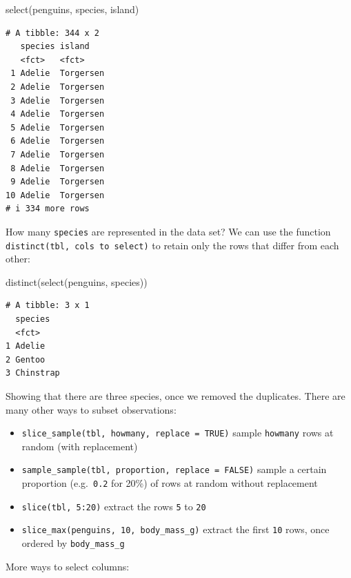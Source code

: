 \documentclass[
  letterpaper,
  DIV=11,
  numbers=noendperiod]{scrreprt}
\newenvironment{Shaded}{\begin{snugshade}}{\end{snugshade}}
\newcommand{\FunctionTok}[1]{\textcolor[rgb]{0.28,0.35,0.67}{#1}}
\newcommand{\NormalTok}[1]{\textcolor[rgb]{0.00,0.23,0.31}{#1}}
\providecommand{\tightlist}{%
  \setlength{\itemsep}{0pt}\setlength{\parskip}{0pt}}\usepackage{longtable,booktabs,array}
\begin{document}
\begin{Shaded}
\begin{Highlighting}[]
\FunctionTok{select}\NormalTok{(penguins, species, island)}
\end{Highlighting}
\end{Shaded}

\begin{verbatim}
# A tibble: 344 x 2
   species island   
   <fct>   <fct>    
 1 Adelie  Torgersen
 2 Adelie  Torgersen
 3 Adelie  Torgersen
 4 Adelie  Torgersen
 5 Adelie  Torgersen
 6 Adelie  Torgersen
 7 Adelie  Torgersen
 8 Adelie  Torgersen
 9 Adelie  Torgersen
10 Adelie  Torgersen
# i 334 more rows
\end{verbatim}

How many \texttt{species} are represented in the data set? We can use
the function \texttt{distinct(tbl,\ cols\ to\ select)} to retain only
the rows that differ from each other:

\begin{Shaded}
\begin{Highlighting}[]
\FunctionTok{distinct}\NormalTok{(}\FunctionTok{select}\NormalTok{(penguins, species))}
\end{Highlighting}
\end{Shaded}

\begin{verbatim}
# A tibble: 3 x 1
  species  
  <fct>    
1 Adelie   
2 Gentoo   
3 Chinstrap
\end{verbatim}

Showing that there are three species, once we removed the duplicates.
There are many other ways to subset observations:

\begin{itemize}
\tightlist
\item
  \texttt{slice\_sample(tbl,\ howmany,\ replace\ =\ TRUE)} sample
  \texttt{howmany} rows at random (with replacement)
\item
  \texttt{sample\_sample(tbl,\ proportion,\ replace\ =\ FALSE)} sample a
  certain proportion (e.g.~\texttt{0.2} for 20\%) of rows at random
  without replacement
\item
  \texttt{slice(tbl,\ 5:20)} extract the rows \texttt{5} to \texttt{20}
\item
  \texttt{slice\_max(penguins,\ 10,\ body\_mass\_g)} extract the first
  \texttt{10} rows, once ordered by \texttt{body\_mass\_g}
\end{itemize}

More ways to select columns:
\end{document}
